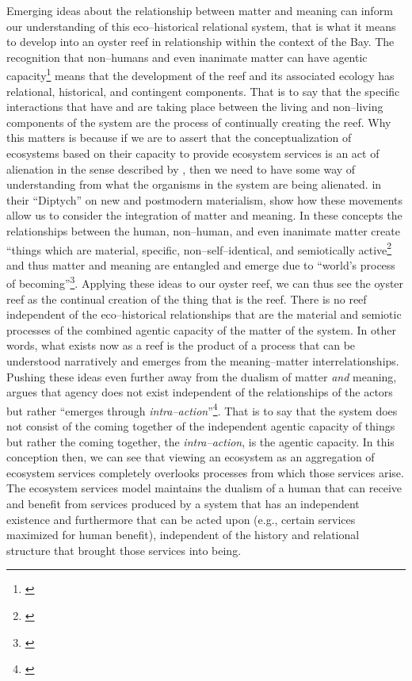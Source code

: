 \documentclass{article}
\begin{document}
{Emerging ideas about the relationship between matter and meaning can inform our understanding of this eco--historical relational system, that is what it means to develop into an oyster reef in relationship within the context of the Bay. The recognition that non--humans and even inanimate matter can have agentic capacity\footnote{\cite{iovino_theorizing_2012}} means that the development of the reef and its associated ecology has relational, historical, and contingent components. That is to say that the specific interactions that have and are taking place between the living and non--living components of the system are the process of continually creating the reef. Why this matters is because if we are to assert that the conceptualization of ecosystems based on their capacity to provide ecosystem services is an act of alienation in the sense described by \citeauthor{tsing_mushroom_2021}, then we need to have some way of understanding from what the organisms in the system are being alienated. \citeauthor{iovino_theorizing_2012} in their ``Diptych'' on new and postmodern materialism, show how these movements allow us to consider the integration of matter and meaning. In these concepts the relationships between the human, non--human, and even inanimate matter create ``things which are material, specific, non--self--identical, and semiotically active\footnote{\cite[p. 462]{iovino_theorizing_2012}} and thus matter and meaning are entangled and emerge due to ``world's process of becoming''\footnote{\cite[p. 453]{iovino_theorizing_2012}}. Applying these ideas to our oyster reef, we can thus see the oyster reef as the continual creation of the thing that is the reef. There is no reef independent of the eco--historical relationships that are the material and semiotic processes of the combined agentic capacity of the matter of the system. In other words, what exists now as a reef is the product of a process that can be understood narratively and emerges from the meaning--matter interrelationships. Pushing these ideas even further away from the dualism of matter \emph{and} meaning, \citeauthor{barad_paper} argues that agency does not exist independent of the relationships of the actors but rather ``emerges through \emph{intra--action}''\footnote{\cite[p. 466]{iovino_theorizing_2012}}. That is to say that the system does not consist of the coming together of the independent agentic capacity of things but rather the coming together, the \emph{intra--action}, is the agentic capacity. In this conception then, we can see that viewing an ecosystem as an aggregation of ecosystem services completely overlooks processes from which those services arise. The ecosystem services model maintains the dualism of a human that can receive and benefit from services produced by a system that has an independent existence and furthermore that can be acted upon (e.g., certain services maximized for human benefit), independent of the history and relational structure that brought those services into being.
}
\end{document}
